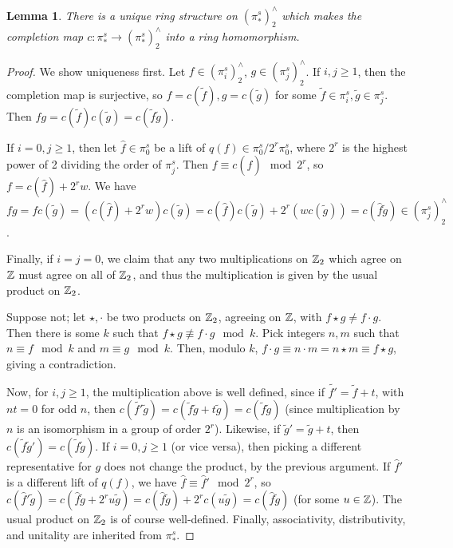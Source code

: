 \documentclass[11pt, titlepage]{article} %
\def\inte{\ensuremath\mathbb{Z}}
\numberwithin{equation}{subsection}
\theoremstyle{plain}
\newtheorem{lemma}[theorem]{Lemma}
\theoremstyle{definition}
\begin{document}
\begin{lemma}\label{2504071013}
There is a unique ring structure on \((\pi_*^s)^\wedge_2\) which makes the completion map \(c : \pi_*^s \to (\pi_*^s)^\wedge_2\) into a ring homomorphism. 
\end{lemma}

\begin{proof}
We show uniqueness first. Let \(f \in (\pi_i^s)^\wedge_2\), \(g \in (\pi_j^s)^\wedge_2\). If \(i,j \geq 1\), then the completion map is surjective, so \(f=c(\tilde f), g = c(\tilde g)\) for some \(\tilde f \in \pi_i^s, \tilde g \in \pi_j^s\). Then \(fg=c(\tilde f)c(\tilde g)=c(\tilde f \tilde g)\).

If \(i=0, j\geq 1\), then let \(\hat f\in \pi_0^s\) be a lift of \(q(f)\in \pi_0^s/2^r\pi_0^s\), where \(2^r\) is the highest power of 2 dividing the order of \(\pi_j^s\). Then \(f\equiv c(\hat f) \mod 2^r\), so \(f=c(\hat f) + 2^rw\). We have \(fg=fc(\tilde g)=(c(\hat f) + 2^r w)c(\tilde g)=c(\hat f) c(\tilde g)+2^r(wc(\tilde g))=c(\hat f \tilde g)\in (\pi_j^s)^\wedge_2\). 

Finally, if \(i=j=0\), we claim that any two multiplications on \(\inte_2\) which agree on \(\inte\) must agree on all of \(\inte_2\), and thus the multiplication is given by the usual product on \(\inte_2\). 

Suppose not; let \(\star, \cdot\) be two products on \(\inte_2\), agreeing on \(\inte\), with \(f\star g \neq f \cdot g\). Then there is some \(k\) such that \(f \star g \not\equiv f \cdot g \mod k\). Pick integers \(n, m\) such that \(n\equiv f \mod k\) and \(m \equiv g \mod k\). Then, modulo \(k\), \(f\cdot g \equiv n\cdot m =n\star m \equiv f \star g\), giving a contradiction.

Now, for \(i, j \geq 1\), the multiplication above is well defined, since if \(\tilde{f'}=\tilde f+t\), with \(nt=0\) for odd \(n\), then \(c(\tilde{f'}\tilde g)=c(\tilde f \tilde g + t\tilde g)=c(\tilde f \tilde g)\) (since multiplication by \(n\) is an isomorphism in a group of order \(2^r\)). Likewise, if \(\tilde{g}'=\tilde g + t\), then \(c(\tilde f \tilde{g}')=c(\tilde f \tilde g)\). If \(i=0, j \geq 1\)  (or vice versa), then picking a different representative for \(g\) does not change the product, by the previous argument. If \(\hat f'\) is a different lift of \(q(f)\), we have \(\hat f \equiv \hat f' \mod 2^r\), so \(c(\hat f' \tilde g)=c(\hat f\tilde g + 2^ru\tilde g)=c(\hat f \tilde g)+2^rc(u\tilde g)=c(\hat f \tilde g)\) (for some \(u \in \inte\)). The usual product on \(\inte_2\) is of course well-defined. Finally, associativity, distributivity, and unitality are inherited from \(\pi_*^s\).
\end{proof}
\end{document}
